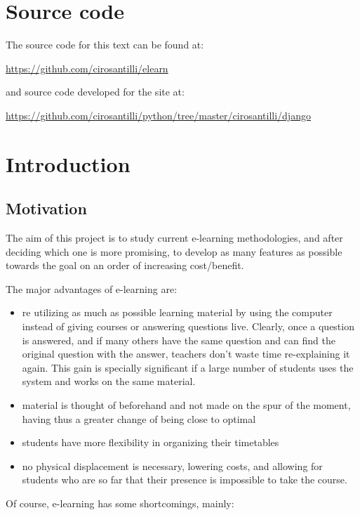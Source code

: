 \documentclass[12pt]{article}
\begin{document}
\section{Source code} \label{source-code}

The source code for this text can be found at:

\url{https://github.com/cirosantilli/elearn}

and source code developed for the site at:

\url{https://github.com/cirosantilli/python/tree/master/cirosantilli/django}

\section{Introduction} \label{introduction}

\subsection{Motivation} \label{motivation}

The aim of this project is to study current e-learning methodologies, and after deciding which one is more promising, to develop as many features as possible towards the goal on an order of increasing cost/benefit.

The major advantages of e-learning are:

\begin{itemize}
  \item re utilizing as much as possible learning material by using the computer instead of giving courses or answering questions live. Clearly, once a question is answered, and if many others have the same question and can find the original question with the answer, teachers don't waste time re-explaining it again. This gain is specially significant if a large number of students uses the system and works on the same material.
  \item material is thought of beforehand and not made on the spur of the moment, having thus a greater change of being close to optimal
  \item students have more flexibility in organizing their timetables
  \item no physical displacement is necessary, lowering costs, and allowing for students who are so far that their presence is impossible to take the course.
\end{itemize}

Of course, e-learning has some shortcomings, mainly:
\end{document}
